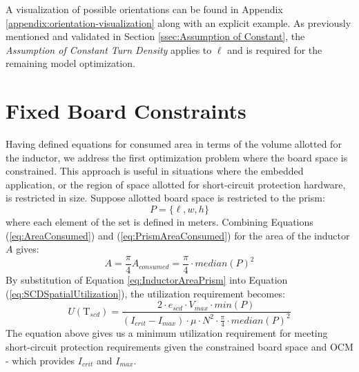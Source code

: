 \documentclass[11pt,oneside]{report}
\begin{document}
    A visualization of possible orientations can be found in Appendix \ref{appendix:orientation-visualization} along with an explicit example. As previously mentioned and validated in Section \ref{ssec:Assumption of Constant}, the \textit{Assumption of Constant Turn Density} applies to $\ell$ and is required for the remaining model optimization.

    
    \section*{Fixed Board Constraints}
    
    Having defined equations for consumed area in terms of the volume allotted for the inductor, we address the first optimization problem where the board space is constrained. This approach is useful in situations where the embedded application, or the region of space allotted for short-circuit protection hardware, is restricted in size. Suppose allotted board space is restricted to the prism:
    \begin{equation}\label{eq:Prism2}
    P = \{\ell, w, h\} \nonumber
    \end{equation}
    where each element of the set is defined in meters. Combining Equations (\ref{eq:AreaConsumed}) and (\ref{eq:PrismAreaConsumed}) for the area of the inductor $A$ gives:
    \begin{equation}\label{eq:InductorAreaPrism}
    A = \frac{\pi}{4} A_{consumed} = \frac{\pi}{4} \cdot median(P)^2 \nonumber
    \end{equation}
    By substitution of Equation \ref{eq:InductorAreaPrism} into Equation (\ref{eq:SCDSpatialUtilization}), the utilization requirement becomes:
    \begin{equation}\label{eq:MinUtilizationPrism}
    U(\mathrm{T}_{scd}) = \frac{2 \cdot e_{scd} \cdot V_{max} \cdot min(P)}{(I_{crit}-I_{max}) \cdot \mu \cdot N^{2} \cdot \frac{\pi}{4} \cdot median(P)^2}
    \end{equation}
    The equation above gives us a minimum utilization requirement for meeting short-circuit protection requirements given the constrained board space and OCM - which provides $I_{crit}$ and $I_{max}$.
\end{document}
